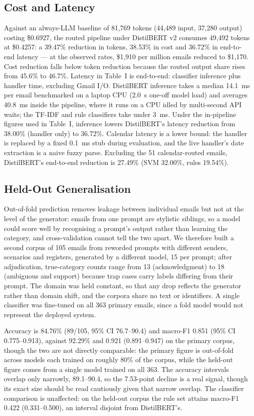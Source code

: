 \documentclass[conference]{IEEEtran}
\begin{document}
\subsection{Cost and Latency}
Against an always-LLM baseline of 81,769 tokens (44,489 input, 37,280 output) costing \$0.6927, the routed pipeline under DistilBERT v2 consumes 49,492 tokens at \$0.4257: a 39.47\% reduction in tokens, 38.53\% in cost and 36.72\% in end-to-end latency --- at the observed rates, \$1,910 per million emails reduced to \$1,170. Cost reduction falls below token reduction because the routed output share rises from 45.6\% to 46.7\%. Latency in Table~I is end-to-end: classifier inference plus handler time, excluding Gmail I/O. DistilBERT inference takes a median 14.1~ms per email benchmarked on a laptop CPU (2.0~s one-off model load) and averages 40.8~ms inside the pipeline, where it runs on a CPU idled by multi-second API waits; the TF-IDF and rule classifiers take under 3~ms. Under the in-pipeline figures used in Table~I, inference lowers DistilBERT's latency reduction from 38.00\% (handler only) to 36.72\%. Calendar latency is a lower bound: the handler is replaced by a fixed 0.1~ms stub during evaluation, and the live handler's date extraction is a naive fuzzy parse. Excluding the 51 calendar-routed emails, DistilBERT's end-to-end reduction is 27.49\% (SVM 32.00\%, rules 19.54\%).

\subsection{Held-Out Generalisation}
Out-of-fold prediction removes leakage between individual emails but not at the level of the generator: emails from one prompt are stylistic siblings, so a model could score well by recognising a prompt's output rather than learning the category, and cross-validation cannot tell the two apart. We therefore built a second corpus of 105 emails from reworded prompts with different senders, scenarios and registers, generated by a different model, 15 per prompt; after adjudication, true-category counts range from 13 (acknowledgment) to 18 (ambiguous and support) because trap cases carry labels differing from their prompt. The domain was held constant, so that any drop reflects the generator rather than domain shift, and the corpora share no text or identifiers. A single classifier was fine-tuned on all 363 primary emails, since a fold model would not represent the deployed system.

Accuracy is 84.76\% (89/105, 95\% CI 76.7--90.4) and macro-F1 0.851 (95\% CI 0.775--0.913), against 92.29\% and 0.921 (0.891--0.947) on the primary corpus, though the two are not directly comparable: the primary figure is out-of-fold across models each trained on roughly 80\% of the corpus, while the held-out figure comes from a single model trained on all 363. The accuracy intervals overlap only narrowly, 89.1--90.4, so the 7.53-point decline is a real signal, though its exact size should be read cautiously given that narrow overlap. The classifier comparison is unaffected: on the held-out corpus the rule set attains macro-F1 0.422 (0.331--0.500), an interval disjoint from DistilBERT's.
\end{document}
